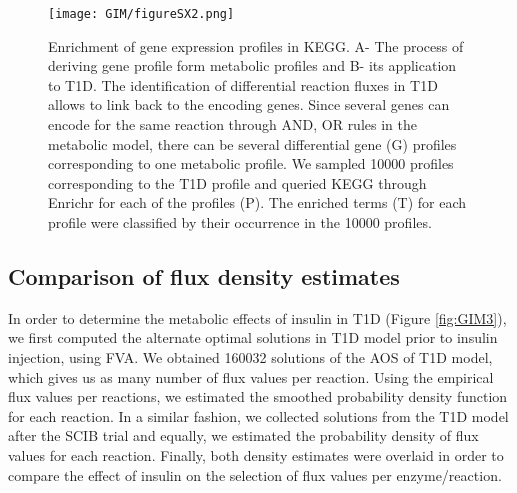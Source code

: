 \begin{figure}[!htp]
\centering
	\texttt{[image: GIM/figureSX2.png]}%
	\caption[Enrichment of gene expression profiles in KEGG.]{Enrichment of gene expression profiles in KEGG. A- The process of deriving gene profile form metabolic profiles and B- its application to T1D. The identification of differential reaction fluxes in T1D allows to link back to the encoding genes. Since several genes can encode for the same reaction through AND, OR rules in the metabolic model, there can be several differential gene (G) profiles corresponding to one metabolic profile. We sampled 10000 profiles corresponding to the T1D profile and queried KEGG through Enrichr \cite{chen2013enrichr} for each of the profiles (P). The enriched terms (T) for each profile were classified by their occurrence in the 10000 profiles.}
	\label{fig:sx2GIM}
\end{figure}
\subsection{Comparison of flux density estimates}
In order to determine the metabolic effects of insulin in T1D (Figure \ref{fig:GIM3}), we first computed the alternate optimal solutions in T1D model prior to insulin injection, using FVA. We obtained 160032 solutions of the AOS of T1D model, which gives us as many number of flux values per reaction. Using the empirical flux values per reactions, we estimated the smoothed probability density function for each reaction. In a similar fashion, we collected solutions from the T1D model after the SCIB trial and equally, we estimated the probability density of flux values for each reaction. Finally, both density estimates were overlaid in order to compare the effect of insulin on the selection of flux values per enzyme/reaction.
